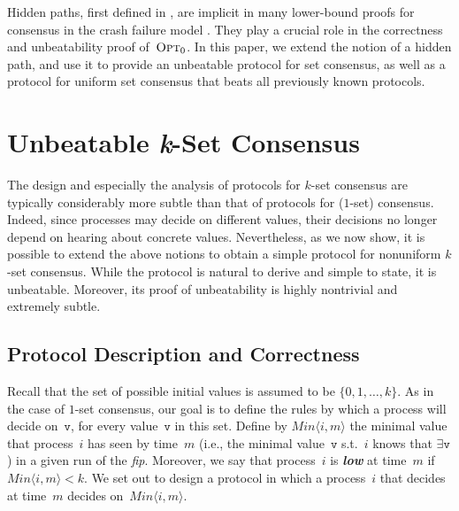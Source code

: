 \documentclass[11pt]{article}
\theoremstyle{definition}
\newcommand{\mv}{\mathtt{v}}
\newcommand{\minval}[1]{\ensuremath{\mathit{Min}\node{#1}}}
\newcommand{\defemph}[1]{\textbf{\textit{#1}}}
\newcommand{\OptZ}{\mbox{$\mbox{{\sc Opt}}_0$}}
\newcommand{\node}[1]{\langle#1\rangle}
\newcommand{\fip}{{\it fip}}
\begin{document}
Hidden paths,
first defined in \cite{AYY-DISC}, are implicit in many lower-bound proofs for consensus in the crash failure model \cite{DRS,DM}.
 They play a crucial role in the correctness and unbeatability proof of~$\OptZ$.
In this paper, we extend the notion of a hidden path, and use it to provide an unbeatable protocol for set consensus, as well as a protocol for uniform set consensus that beats all previously known protocols.

\section{Unbeatable
{\bf\emph{k}}-Set Consensus}
\label{sec-set-consensus}

The design and especially the analysis of protocols for $k$-set consensus are typically considerably more subtle than that of protocols for ($1$-set) consensus. Indeed, since processes may decide on different values, their decisions no longer depend on hearing about concrete values. Nevertheless, as we now show, it is possible to extend the above notions to obtain a simple protocol for nonuniform $k$-set consensus. While the protocol is natural to derive and simple to state, it is unbeatable. Moreover, its proof of unbeatability is highly nontrivial and extremely subtle.

\subsection{Protocol Description and Correctness}

Recall that the set of possible initial values is assumed to be $\{0,1,\ldots,k\}$.
As in the case of $1$-set consensus, our goal is to define the rules by which a process will decide on~$\mv$, for every value~$\mv$ in this set.
Define by $\minval{i,m}$ the minimal value that process~$i$ has seen by time~$m$
(i.e., the minimal value~$\mv$ s.t.\ $i$ knows that $\exists\mv$)
in a given run of the \fip.
Moreover, we say that process~$i$ is \defemph{low} at time~$m$ if $\minval{i,m}<k$.
We set out to design a protocol in which a process~$i$ that decides at time~$m$  decides on~$\minval{i,m}$.
\end{document}
